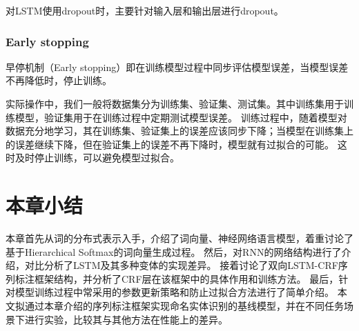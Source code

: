 对LSTM使用dropout时，主要针对输入层和输出层进行dropout。
\subsubsection{Early stopping}
早停机制（Early stopping）即在训练模型过程中同步评估模型误差，当模型误差不再降低时，停止训练。

实际操作中，我们一般将数据集分为训练集、验证集、测试集。其中训练集用于训练模型，验证集用于在训练过程中定期测试模型误差。
训练过程中，随着模型对数据充分地学习，其在训练集、验证集上的误差应该同步下降；当模型在训练集上的误差继续下降，但在验证集上的误差不再下降时，模型就有过拟合的可能。
这时及时停止训练，可以避免模型过拟合。
\section{本章小结}
本章首先从词的分布式表示入手，介绍了词向量、神经网络语言模型，着重讨论了基于Hierarchical Softmax的词向量生成过程。
然后，对RNN的网络结构进行了介绍，对比分析了LSTM及其多种变体的实现差异。
接着讨论了双向LSTM-CRF序列标注框架结构，并分析了CRF层在该框架中的具体作用和训练方法。
最后，针对模型训练过程中常采用的参数更新策略和防止过拟合方法进行了简单介绍。
本文拟通过本章介绍的序列标注框架实现命名实体识别的基线模型，并在不同任务场景下进行实验，比较其与其他方法在性能上的差异。

